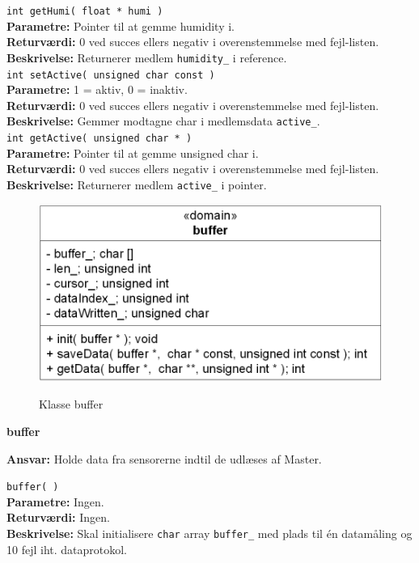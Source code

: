 \verb+int getHumi( float * humi )+ \\
\textbf{Parametre:} Pointer til at gemme humidity i. \\
\textbf{Returværdi:} 0 ved succes ellers negativ i overenstemmelse med fejl-listen. \\
\textbf{Beskrivelse:} Returnerer medlem \verb+humidity_+ i reference. \\

\verb+int setActive( unsigned char const )+ \\
\textbf{Parametre:} 1 = aktiv, 0 = inaktiv. \\
\textbf{Returværdi:} 0 ved succes ellers negativ i overenstemmelse med fejl-listen. \\
\textbf{Beskrivelse:} Gemmer modtagne char i medlemsdata \verb+active_+. \\

\verb+int getActive( unsigned char * )+ \\
\textbf{Parametre:} Pointer til at gemme unsigned char i. \\
\textbf{Returværdi:} 0 ved succes ellers negativ i overenstemmelse med fejl-listen. \\
\textbf{Beskrivelse:} Returnerer medlem \verb+active_+ i pointer. \\


\begin{figure}[htbp] \centering
{\includegraphics[scale=1.3]{filer/design/Klassediagrammer/sw_psoc_buffer}}
\caption{Klasse buffer}
\label{fig:sw_psoc_class_buffer}
\end{figure} 

{\centering
\textbf{buffer}\par
}
\textbf{Ansvar:} Holde data fra sensorerne indtil de udlæses af Master. \

\verb+buffer( )+ \\
\textbf{Parametre:} Ingen. \\
\textbf{Returværdi:} Ingen. \\
\textbf{Beskrivelse:} Skal initialisere \verb+char+ array \verb+buffer_+ med plads til én datamåling og 10 fejl iht. dataprotokol. \\

